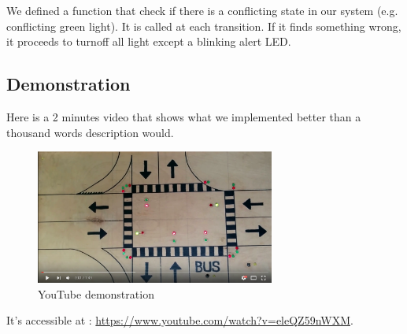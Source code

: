 We defined a function that check if there is a conflicting state in our system (e.g. conflicting green light). It is called at each transition. If it finds something wrong, it proceeds to turnoff all light except a blinking alert LED.


\subsection{Demonstration}

Here is a 2 minutes video that shows what we implemented better than a thousand words description would.

\begin{figure}[H]\label{fig:ytv}
  \centering
    \includegraphics[width=0.7\textwidth]{picture/demo.png}
    \caption{YouTube demonstration}
\end{figure}

It's accessible at :  \url{https://www.youtube.com/watch?v=eleQZ59nWXM}.